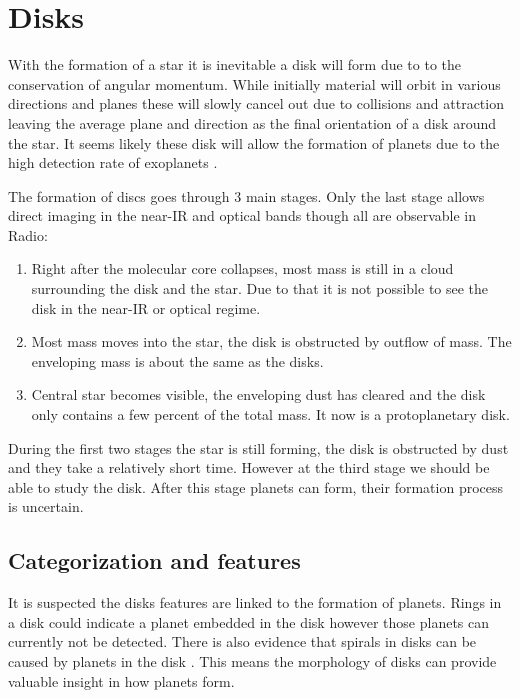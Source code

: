 \section{Disks} %
\label{sec:disks} %

With the formation of a star it is inevitable a disk will form due to to the conservation of angular momentum. While initially material will orbit in various directions and planes these will slowly cancel out due to collisions and attraction leaving the average plane and direction as the final orientation of a disk around the star. It seems likely these disk will allow the formation of planets due to the high detection rate of exoplanets \cite{williams}.

The formation of discs goes through 3 main stages\cite{williams}. Only the last stage allows direct imaging in the near-IR and optical bands though all are observable in Radio:

\begin{enumerate}
  \item Right after the molecular core collapses, most mass is still in a cloud surrounding the disk and the star. Due to that it is not possible to see the disk in the near-IR  or optical regime.
  \item Most mass moves into the star, the disk is obstructed by outflow of mass. The enveloping mass is about the same as the disks.
  \item Central star becomes visible, the enveloping dust has cleared and the disk only contains a few percent of the total mass. It now is a protoplanetary disk.
\end{enumerate}

During the first two stages the star is still forming, the disk is obstructed by dust and they take a relatively short time. However at the third stage we should be able to study the disk. After this stage planets can form, their formation process is uncertain. 

\subsection{Categorization and features}

It is suspected the disks features are linked to the formation of planets. Rings in a disk could indicate a planet embedded in the disk \cite{rings} however those planets can currently not be detected. There is also evidence that spirals in disks can be caused by planets in the disk \cite{garufi}. This means the morphology of disks can provide valuable insight in how planets form.

